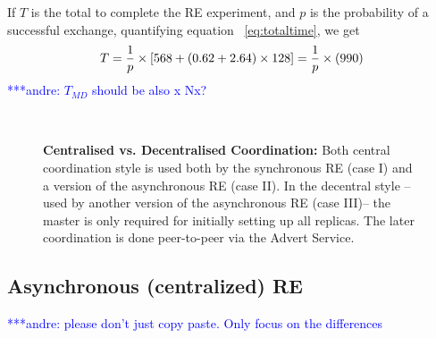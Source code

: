 \documentclass{rspublic}
\newcommand{\alnote}[1]{ {\textcolor{blue} { ***andre: #1 }}}
\newcommand{\alnote}[1]{}
\begin{document}
If $T$ is the total to complete the RE experiment, and $p$ is the
probability of a successful exchange, quantifying equation
~\ref{eq:totaltime}, we get
\begin{eqnarray}
T=  {1 \over p} \times {[ 568+ (0.62 + 2.64)\times 128]} = {1 \over p} \times (990)
\label{eq:timebt}
\end{eqnarray}
\alnote{$T_{MD}$ should be also x Nx?}


\begin{figure}%
\centering
{}\qquad
{}\\
\caption{\textbf{Centralised vs. Decentralised Coordination:} Both
  central coordination style is used both by the synchronous RE (case
  I) and a version of the asynchronous RE (case II).  In the decentral
  style -- used by another version of the asynchronous RE (case III)--
  the master is only required for initially setting up all
  replicas. The later coordination is done peer-to-peer via the Advert
  Service.}
\label{fig:coordination}
\end{figure}


\subsection{Asynchronous (centralized) RE}
\alnote{please don't just copy paste. Only focus on the differences}
\end{document}
